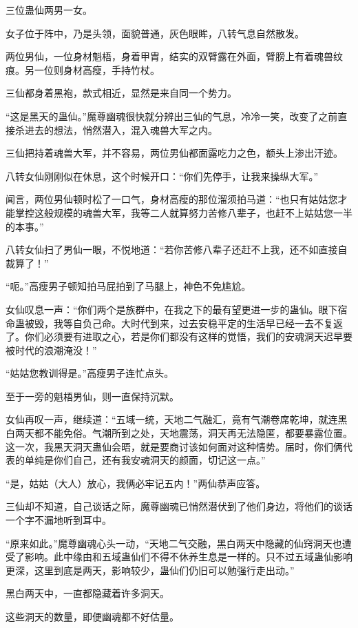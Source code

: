 \begin{this_body}
三位蛊仙两男一女。

女子位于阵中，乃是头领，面貌普通，灰色眼眸，八转气息自然散发。

两位男仙，一位身材魁梧，身着甲胄，结实的双臂露在外面，臂膀上有着魂兽纹痕。另一位则身材高瘦，手持竹杖。

三仙都身着黑袍，款式相近，显然是来自同一个势力。

“这是黑天的蛊仙。”魔尊幽魂很快就分辨出三仙的气息，冷冷一笑，改变了之前直接杀进去的想法，悄然潜入，混入魂兽大军之内。

三仙把持着魂兽大军，并不容易，两位男仙都面露吃力之色，额头上渗出汗迹。

八转女仙刚刚似在休息，这个时候开口：“你们先停手，让我来操纵大军。”

闻言，两位男仙顿时松了一口气，身材高瘦的那位溜须拍马道：“也只有姑姑您才能掌控这般规模的魂兽大军，我等二人就算努力苦修八辈子，也赶不上姑姑您一半的本事。”

八转女仙扫了男仙一眼，不悦地道：“若你苦修八辈子还赶不上我，还不如直接自裁算了！”

“呃。”高瘦男子顿知拍马屁拍到了马腿上，神色不免尴尬。

女仙叹息一声：“你们两个是族群中，在我之下的最有望更进一步的蛊仙。眼下宿命蛊被毁，我等自负己命。大时代到来，过去安稳平定的生活早已经一去不复返了。你们必须要有进取之心，若是你们都没有这样的觉悟，我们的安魂洞天迟早要被时代的浪潮淹没！”

“姑姑您教训得是。”高瘦男子连忙点头。

至于一旁的魁梧男仙，则一直保持沉默。

女仙再叹一声，继续道：“五域一统，天地二气融汇，竟有气潮卷席乾坤，就连黑白两天都不能免俗。气潮所到之处，天地震荡，洞天再无法隐匿，都要暴露位置。这一次，我黑天洞天蛊仙会晤，就是要商讨该如何面对这种情势。届时，你们俩代表的单纯是你们自己，还有我安魂洞天的颜面，切记这一点。”

“是，姑姑（大人）放心，我俩必牢记五内！”两仙恭声应答。

三仙却不知道，自己谈话之际，魔尊幽魂已悄然潜伏到了他们身边，将他们的谈话一个字不漏地听到耳中。

“原来如此。”魔尊幽魂心头一动，“天地二气交融，黑白两天中隐藏的仙窍洞天也遭受了影响。此中缘由和五域蛊仙们不得不休养生息是一样的。只不过五域蛊仙影响更深，这里到底是两天，影响较少，蛊仙们仍旧可以勉强行走出动。”

黑白两天中，一直都隐藏着许多洞天。

这些洞天的数量，即便幽魂都不好估量。


\end{this_body}
